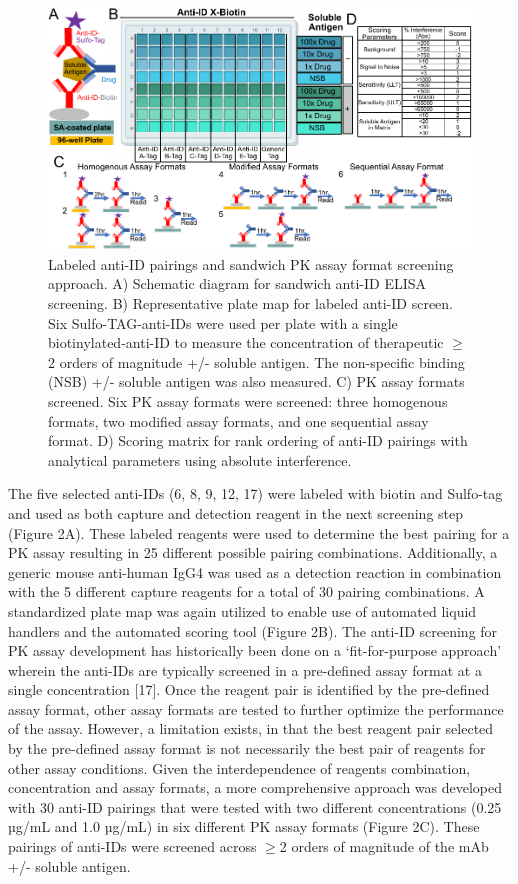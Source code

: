 \begin{figure}[ht]
 \centering
 \includegraphics{graphics/ch3/Figure_2.pdf}
 \caption{Labeled anti-ID pairings and sandwich PK assay format screening approach.  A) Schematic diagram for sandwich anti-ID ELISA screening.  B) Representative plate map for labeled anti-ID screen.  Six Sulfo-TAG-anti-IDs were used per plate with a single biotinylated-anti-ID to measure the concentration of therapeutic $\geq$2 orders of magnitude +/- soluble antigen.  The non-specific binding (NSB) +/- soluble antigen was also measured.  C) PK assay formats screened.  Six PK assay formats were screened: three homogenous formats, two modified assay formats, and one sequential assay format. D) Scoring matrix for rank ordering of anti-ID pairings with analytical parameters using absolute interference.}
 \end{figure}


The five selected anti-IDs (6, 8, 9, 12, 17) were labeled with biotin and Sulfo-tag and used as both capture and detection reagent in the next screening step (Figure 2A).  These labeled reagents were used to determine the best pairing for a PK assay resulting in 25 different possible pairing combinations.  Additionally, a generic mouse anti-human IgG4 was used as a detection reaction in combination with the 5 different capture reagents for a total of 30 pairing combinations.  A standardized plate map was again utilized to enable use of automated liquid handlers and the automated scoring tool (Figure 2B).  The anti-ID screening for PK assay development has historically been done on a ‘fit-for-purpose approach’ wherein the anti-IDs are typically screened in a pre-defined assay format at a single concentration [17]. Once the reagent pair is identified by the pre-defined assay format, other assay formats are tested to further optimize the performance of the assay. However, a limitation exists, in that the best reagent pair selected by the pre-defined assay format is not necessarily the best pair of reagents for other assay conditions. Given the interdependence of reagents combination, concentration and assay formats, a more comprehensive approach was developed with 30 anti-ID pairings that were tested with two different concentrations (0.25 µg/mL and 1.0 µg/mL) in six different PK assay formats (Figure 2C).  These pairings of anti-IDs were screened across $\geq$2 orders of magnitude of the mAb +/- soluble antigen.  


